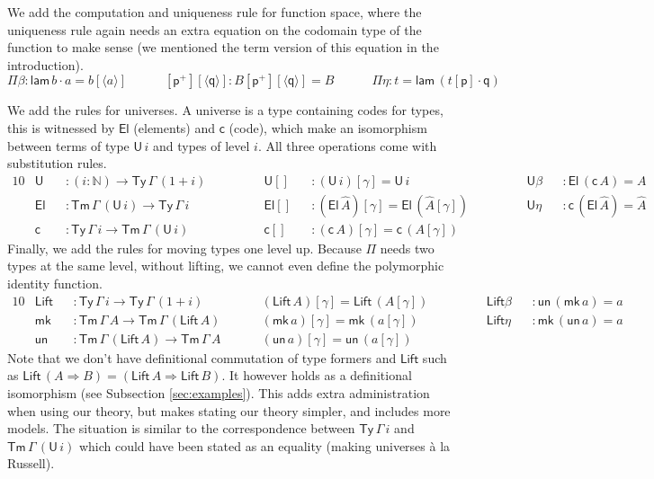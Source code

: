 \documentclass[a4paper,UKenglish]{article}
\newcommand{\ra}{\rightarrow}
\newcommand{\Ra}{\Rightarrow}
\newcommand{\Ty}{\mathsf{Ty}}
\newcommand{\Tm}{\mathsf{Tm}}
\newcommand{\p}{\mathsf{p}}
\newcommand{\q}{\mathsf{q}}
\newcommand{\N}{\mathbb{N}}
\newcommand{\lam}{\mathsf{lam}}
\newcommand{\U}{\mathsf{U}}
\newcommand{\El}{\mathsf{El}}
\newcommand{\cd}{\mathsf{c}}
\newcommand{\Lift}{\mathsf{Lift}}
\newcommand{\mk}{\mathsf{mk}}
\newcommand{\un}{\mathsf{un}}
\begin{document}
We add the computation and uniqueness rule for function space, where
the uniqueness rule again needs an extra equation on the codomain type
of the function to make sense (we mentioned the term version of this equation in the introduction).
\[
\Pi\beta : \lam\,b\cdot a = b[\langle a\rangle] \hspace{3em}
[\p^+][\langle\q\rangle] : B[\p^+][\langle\q\rangle] = B \hspace{3em}
\Pi\eta : t = \lam\,(t[\p]\cdot\q)
\]

We add the rules for universes. A universe is a type containing codes
for types, this is witnessed by $\El$ (elements) and $\cd$ (code),
which make an isomorphism between terms of type $\U\,i$ and types of
level $i$. All three operations come with substitution rules.
\begin{alignat*}{10}
  & \U && : (i:\N)\ra\Ty\,\Gamma\,(1+i)\hspace{3em} && \U[] && : (\U\,i)[\gamma] = \U\,i                           && \U\beta && : \El\,(\cd\,A) = A \\        
  & \El && : \Tm\,\Gamma\,(\U\,i) \ra \Ty\,\Gamma\,i && \El[] && : (\El\,\hat{A})[\gamma] = \El\,(\hat{A}[\gamma]) \hspace{3em} && \U\eta && : \cd\,(\El\,\hat{A}) = \hat{A} \\
  & \cd && : \Ty\,\Gamma\,i\ra\Tm\,\Gamma\,(\U\,i) && \cd[] && : (\cd\,A)[\gamma] = \cd\,(A[\gamma])
\end{alignat*}
Finally, we add the rules for moving types one level up. Because $\Pi$
needs two types at the same level, without lifting, we cannot even
define the polymorphic identity function.
\begin{alignat*}{10}
  & \Lift && : \Ty\,\Gamma\,i\ra\Ty\,\Gamma\,(1+i)\hspace{3em} && (\Lift\,A)[\gamma] = \Lift\,(A[\gamma])\hspace{3em} && \Lift\beta && : \un\,(\mk\,a) = a \\
  & \mk && : \Tm\,\Gamma\,A \ra \Tm\,\Gamma\,(\Lift\,A) && (\mk\,a)[\gamma] = \mk\,(a[\gamma])              && \Lift\eta && : \mk\,(\un\,a) = a \\
  & \un && : \Tm\,\Gamma\,(\Lift\,A) \ra \Tm\,\Gamma\,A && (\un\,a)[\gamma] = \un\,(a[\gamma])
\end{alignat*}
Note that we don't have definitional commutation of type formers and
$\Lift$ such as $\Lift\,(A\Ra B) = (\Lift\,A\Ra\Lift\,B)$. It however
holds as a definitional isomorphism (see Subsection
\ref{sec:examples}). This adds extra administration when using our
theory, but makes stating our theory simpler, and includes more
models. The situation is similar to the correspondence between
$\Ty\,\Gamma\,i$ and $\Tm\,\Gamma\,(\U\,i)$ which could have been
stated as an equality (making universes {\`a} la Russell).
\end{document}
